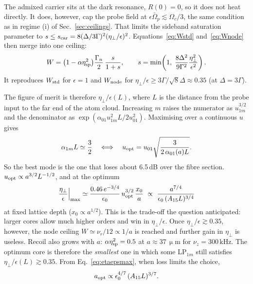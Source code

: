 \documentclass[11pt,a4paper]{article}
\newcommand{\micrometre}{\upmu m}\newcommand{\microkelvin}{\upmu K}
\newcommand{\SI}[2]{\ensuremath{#1\,\mathrm{#2}}}
\newcommand{\Om}{\Omega}
\newcommand{\etaeff}{\eta_{\perp}}
\begin{document}
The admixed carrier sits at the dark resonance, $R(0)=0$, so it does not heat directly. It does, however, cap the probe field at $\epsilon\bar\Om_p\lesssim\Om_c/3$, the same condition as in regime (i) of Sec.~\ref{sec:ceilings}. That limits the sideband saturation parameter to $s\le s_{\rm car}=8(\Delta/3\Gamma)^2(\etaeff/\epsilon)^2$. Equations~\eqref{eq:Wstd} and~\eqref{eq:Wnode} then merge into one ceiling:
\begin{equation}
  W=\bigl(1-\alpha\eta_{\rm sp}^2\bigr)\frac{\Gamma_n}{2}\,\frac{s}{1+s},\qquad s=\min\!\left(1,\;\frac{8\Delta^2}{9\Gamma^2}\frac{\etaeff^2}{\epsilon^2}\right).
  \label{eq:Wunified}
\end{equation}
It reproduces $W_{\rm std}$ for $\epsilon=1$ and $W_{\rm node}$ for $\etaeff/\epsilon\ge3\Gamma/\sqrt8\Delta\approx0.35$ (at $\Delta=3\Gamma$).

The figure of merit is therefore $\etaeff/\epsilon(L)$, where $L$ is the distance from the probe input to the far end of the atom cloud. Increasing $m$ raises the numerator as $u_{1m}^{3/2}$ and the denominator as $\exp(\alpha_{01}u_{1m}^2L/2u_{01}^2)$. Maximising over a continuous $u$ gives
\begin{equation}
  \alpha_{1m}L\simeq\frac32\quad\Longleftrightarrow\quad u_{\rm opt}=u_{01}\sqrt{\frac{3}{2\,\alpha_{01}(a)L}} .
  \label{eq:uopt}
\end{equation}
So the best mode is the one that loses about 6.5\,dB over the fibre section. $u_{\rm opt}\propto a^{3/2}L^{-1/2}$, and at the optimum
\begin{equation}
  \left.\frac{\etaeff}{\epsilon}\right|_{\max}\simeq\frac{0.46\,e^{-3/4}}{\epsilon_0}\,u_{\rm opt}^{3/2}\,\frac{x_0}{a}\ \propto\ \frac{a^{7/4}}{\epsilon_0\,(A_{15}L)^{3/4}}
  \label{eq:etaepsmax}
\end{equation}
at fixed lattice depth ($x_0\propto a^{1/2}$). This is the trade-off the question anticipated: larger cores allow much higher orders and win in $\etaeff/\epsilon$. Once $\etaeff/\epsilon\gtrsim0.35$, however, the node ceiling $W\simeq\nu_r/12\propto1/a$ is reached and further gain in $\etaeff$ is useless. Recoil also grows with $a$: $\alpha\eta_{\rm sp}^2=0.5$ at $a\approx\SI{37}{\micrometre}$ for $\nu_z=\SI{300}{kHz}$. The optimum core is therefore the \emph{smallest} one in which some LP$_{1m}$ still satisfies $\etaeff/\epsilon(L)\gtrsim0.35$. From Eq.~\eqref{eq:etaepsmax}, when loss limits the choice,
\begin{equation}
  a_{\rm opt}\propto\epsilon_0^{4/7}\,(A_{15}L)^{3/7}.
  \label{eq:aopt}
\end{equation}
\end{document}

